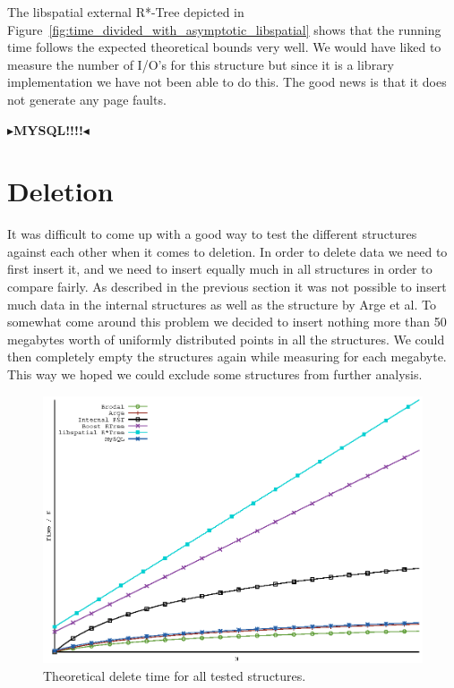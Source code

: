 \documentclass[twoside,11pt,openright]{report}
\newcommand{\todo}[1]{{\color[rgb]{.5,0,0}\textbf{$\blacktriangleright$#1$\blacktriangleleft$}}}
\begin{document}
The libspatial external R*-Tree depicted in Figure~\ref{fig:time_divided_with_asymptotic_libspatial} shows that the running time follows the expected theoretical bounds very well. We would have liked to measure the number of I/O's for this structure but since it is a library implementation we have not been able to do this. The good news is that it does not generate any page faults.

\todo{MYSQL!!!!}

\section{Deletion}
It was difficult to come up with a good way to test the different structures against each other when it comes to deletion. In order to delete data we need to first insert it, and we need to insert equally much in all structures in order to compare fairly. As described in the previous section it was not possible to insert much data in the internal structures as well as the structure by Arge et al. To somewhat come around this problem we decided to insert nothing more than 50 megabytes worth of uniformly distributed points in all the structures. We could then completely empty the structures again while measuring for each megabyte. This way we hoped we could exclude some structures from further analysis.

\begin{figure}[htp!]
\includegraphics[width=\textwidth]{../plots/delete_complexities/delete_complexity}
\caption{Theoretical delete time for all tested structures.}
\label{fig:theory_delete_complexity}
\end{figure}
\end{document}
